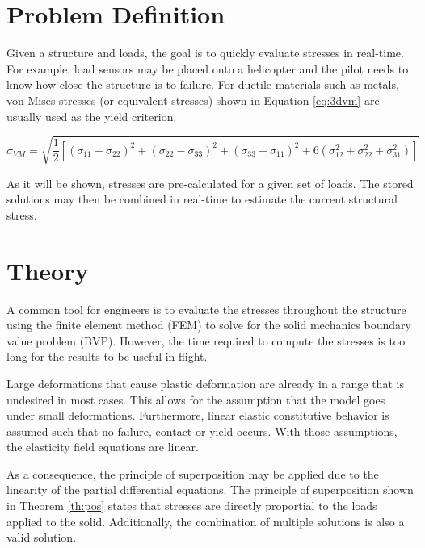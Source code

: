 \documentclass[letterpaper,12pt,]{article}
\begin{document}


\section*{Problem Definition}

Given a structure and loads, the goal is to quickly evaluate stresses in real-time. For example, load sensors may be placed onto a helicopter and the pilot needs to know how close the structure is to failure. For ductile materials such as metals, von Mises stresses (or equivalent stresses) shown in Equation \ref{eq:3dvm} are usually used as the yield criterion.

\begin{equation}
\sigma_{VM} = \sqrt{\frac{1}{2}[
               (\sigma_{11}-\sigma_{22})^{2}
              +(\sigma_{22}-\sigma_{33})^{2}
              +(\sigma_{33}-\sigma_{11})^{2}
              +6(\sigma_{12}^2+\sigma_{22}^2+\sigma_{31}^2)
              ]}
\label{eq:3dvm}
\end{equation}


As it will be shown, stresses are pre-calculated for a given set of loads. The stored solutions may then be combined in real-time to estimate the current structural stress.

\section*{Theory}

A common tool for engineers is to evaluate the stresses throughout the structure using the finite element method (FEM) to solve for the solid mechanics boundary value problem (BVP). However, the time required to compute the stresses is too long for the results to be useful in-flight.

Large deformations that cause plastic deformation are already in a range that is undesired in most cases. This allows for the assumption that the model goes under small deformations. Furthermore, linear elastic constitutive behavior is assumed such that no failure, contact or yield occurs. With those assumptions, the elasticity field equations are linear.


As a consequence, the principle of superposition may be applied due to the linearity of the partial differential equations. The principle of superposition shown in Theorem \ref{th:pos} states that stresses are directly proportial to the loads applied to the solid. Additionally, the combination of multiple solutions is also a valid solution.
\end{document}
